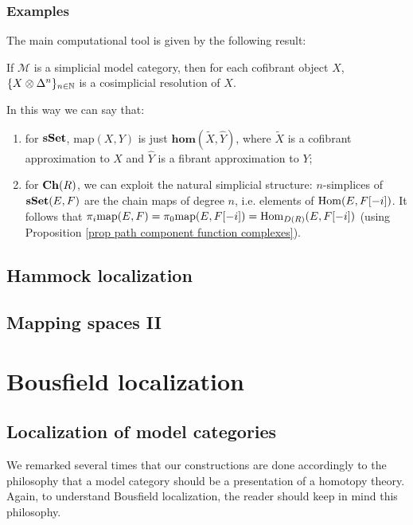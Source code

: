 \begin{refsection}
\subsubsection{Examples}

The main computational tool is given by the following result:

\begin{lemma}
If $\mathcal M$ is a simplicial model category, then for each cofibrant object $X$, $\{X \otimes \Delta^n\}_{n \in \mathbb{N}}$ is a cosimplicial resolution of $X$.
\end{lemma}

In this way we can say that:
\begin{enumerate}
\item for $\mathbf{sSet}$, $\mathrm{map}(X,Y)$ is just $\mathbf{hom}(\widetilde{X}, \widehat{Y})$, where $\widetilde{X}$ is a cofibrant approximation to $X$ and $\widehat{Y}$ is a fibrant approximation to $Y$;
\item for $\mathbf{Ch}(R)$, we can exploit the natural simplicial structure: $n$-simplices of $\mathbf{sSet}(E,F)$ are the chain maps of degree $n$, i.e. elements of $\mathrm{Hom}(E,F[-i])$. It follows that $\pi_i \mathrm{map}(E,F) = \pi_0 \mathrm{map}(E,F[-i]) = \mathrm{Hom}_{D(R)}(E,F[-i])$ (using Proposition \ref{prop path component function complexes}).
\end{enumerate}

\subsection{Hammock localization}

\subsection{Mapping spaces II}

\section{Bousfield localization}

\subsection{Localization of model categories}

We remarked several times that our constructions are done accordingly to the philosophy that a model category should be a presentation of a homotopy theory. Again, to understand Bousfield localization, the reader should keep in mind this philosophy.


\end{refsection}
